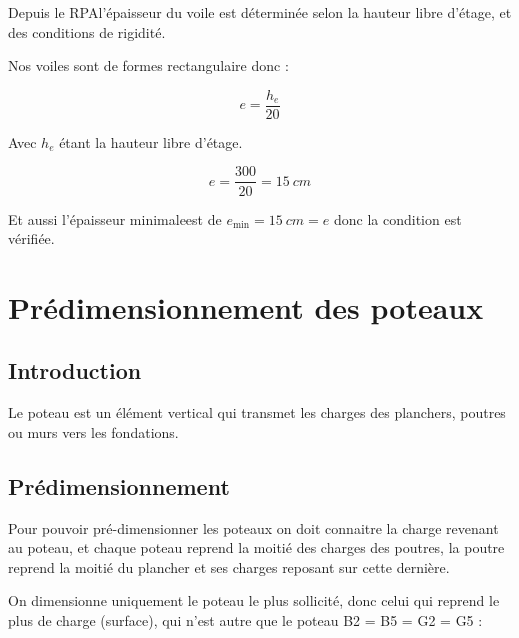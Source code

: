 \documentclass[12pt,a4paper]{report}
\numberwithin{equation}{section}
\begin{document}
	
	
	Depuis le RPA\footnotemark[2] l'épaisseur du voile est déterminée selon la hauteur libre d'étage, et des conditions de rigidité.
	
	Nos voiles sont de formes rectangulaire donc :
	
	\begin{equation}
		e = \dfrac{h_{e}}{20}
		\label{dtr:coffrage-voile}
	\end{equation}
	
	
	Avec $h_{e}$ étant la hauteur libre d'étage.
	
	\[ e = \dfrac{300}{20} = 15 ~\unit{cm} \] 
	
	
	Et aussi l'épaisseur minimale\footnotemark[2] est de $e_{\min} = 15 ~\unit{cm}  = e$ donc la condition est vérifiée.
	
	
	
	
	
	
	
	
	
	
	
	
	
	
	
	
	\section{Prédimensionnement des poteaux}
	
	
	\subsection{Introduction}
	
	Le poteau est un élément vertical qui transmet les charges des planchers, poutres ou murs vers
	les fondations.
	
	\subsection{Prédimensionnement}
	
	
	Pour pouvoir pré-dimensionner les poteaux on doit connaitre la charge revenant au poteau, et chaque poteau reprend la moitié des charges des poutres, la poutre reprend la moitié du plancher et ses charges reposant sur cette dernière.
	
	\vspace{\baselineskip}
		
	On dimensionne uniquement le poteau le plus sollicité, donc celui qui reprend le plus de charge (surface), qui n'est autre que le poteau B2 = B5 = G2 = G5 : 
	
\end{document}
